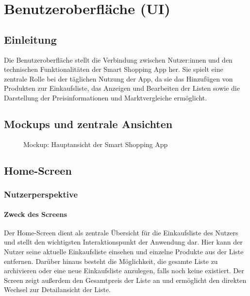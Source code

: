 \chapter{Benutzeroberfläche (UI)}
\renewcommand{\authorinitials}{NK}
\label{chap:ui}

\section{Einleitung}
Die Benutzeroberfläche stellt die Verbindung zwischen Nutzer:innen und den technischen Funktionalitäten der Smart Shopping App her. Sie spielt eine zentrale Rolle bei der täglichen Nutzung der App, da sie das Hinzufügen von Produkten zur Einkaufsliste, das Anzeigen und Bearbeiten der Listen sowie die Darstellung der Preisinformationen und Marktvergleiche ermöglicht.

\section{Mockups und zentrale Ansichten}
\begin{figure}[h!]
    \centering
    \caption{Mockup: Hauptansicht der Smart Shopping App}
    \label{fig:ui_mockup}
\end{figure}

\section{Home-Screen}
\label{sec:home_screen}

\subsection{Nutzerperspektive}

\subsubsection{Zweck des Screens}
Der Home-Screen dient als zentrale Übersicht für die Einkaufsliste des Nutzers und stellt den wichtigsten Interaktionspunkt der Anwendung dar. Hier kann der Nutzer seine aktuelle Einkaufsliste einsehen und einzelne Produkte aus der Liste entfernen. Darüber hinaus besteht die Möglichkeit, die gesamte Liste zu archivieren oder eine neue Einkaufsliste anzulegen, falls noch keine existiert. Der Screen zeigt außerdem den Gesamtpreis der Liste an und ermöglicht den direkten Wechsel zur Detailansicht der Liste.

